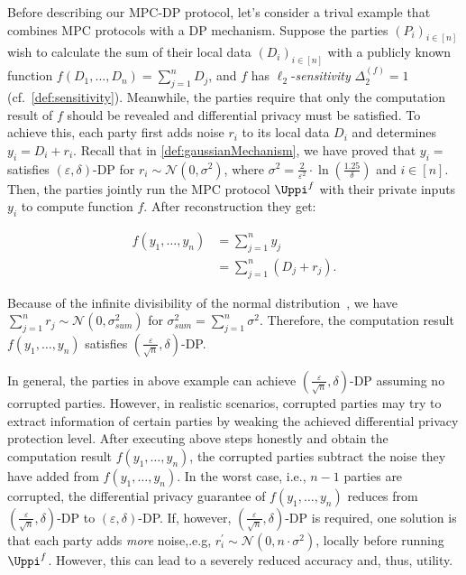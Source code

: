 Before describing our MPC-DP protocol, let's consider a trival example that combines MPC protocols with a DP mechanism. Suppose the parties $\left(P_{i}\right)_{i \in \left[ n\right]} $ wish to calculate the sum of their local data $\left(D_{i}\right)_{i \in \left[ n\right]} $ with a publicly known function $f\left(D_1,\ldots,D_n\right)=\sum_{j=1}^{n} D_j$, and $f$ has $\ell_2$-\textit{sensitivity} $\Delta^{\left(f\right) } _2=1$ (cf.~\autoref{def:sensitivity}). Meanwhile, the parties require that only the computation result of $f$ should be revealed and differential privacy must be satisfied. To achieve this, each party first adds noise $r_i$ to its local data $D_i$ and determines $ y_{i}=D_{i} +r_{i}$. Recall that in \autoref{def:gaussianMechanism}, we have proved that $ y_{i}=$ satisfies $\left(\varepsilon ,\delta \right) $-DP for $r_i \sim \mathcal{N}\left( 0,\sigma ^{2}\right) $, where $\sigma ^{2}=\frac{2}{\varepsilon ^2}\cdot\ln\left(\frac{1.25}{\delta }\right)$ and $i\in \left[n\right] $. Then, the parties jointly run the MPC protocol $\Uppi^{f}$ with their private inputs $y_i$ to compute function $f$. After reconstruction they get:

\begin{equation}
	\begin{split}
		f\left(y_1,\ldots,y_n\right)&=\sum_{j=1}^{n} y_j\\
		&=\sum_{j=1}^{n}\left( D_j+ r_j\right).
	\end{split}
\end{equation}

Because of the infinite divisibility of the normal distribution~\cite{patel1996handbook}, we have $\sum_{j=1}^{n} r_j \sim \mathcal{N}\left( 0,\sigma_{sum} ^{2}\right) $ for $\sigma_{sum} ^{2}=\sum ^{n}_{j=1}\sigma ^{2}$. Therefore, the computation result $f\left(y_1,\ldots,y_n\right)$ satisfies $\left(\frac{\varepsilon}{\sqrt{n}},\delta \right) $-DP.

In general, the parties in above example can achieve $\left(\frac{\varepsilon}{\sqrt{n}},\delta \right) $-DP assuming no corrupted parties. However, in realistic scenarios, corrupted parties may try to extract information of certain parties by weaking the achieved differential privacy protection level.
After executing above steps honestly and obtain the computation result $f\left(y_1,\ldots,y_n\right)$, the corrupted parties subtract the noise they have added from $f\left(y_1,\ldots,y_n\right)$. In the worst case, i.e., $n-1$ parties are corrupted, the differential privacy guarantee of $f\left(y_1,\ldots,y_n\right)$ reduces from $\left(\frac{\varepsilon}{\sqrt{n}},\delta \right) $-DP to $\left(\varepsilon,\delta \right) $-DP. If, however, $\left(\frac{\varepsilon}{\sqrt{n}},\delta \right) $-DP is required, one solution is that each party adds \textit{more} noise,.e.g, $r_i^{\prime} \sim \mathcal{N}\left( 0,n\cdot \sigma ^{2}\right) $, locally before running $\Uppi^{f}$. However, this can lead to a severely reduced accuracy and, thus, utility.

